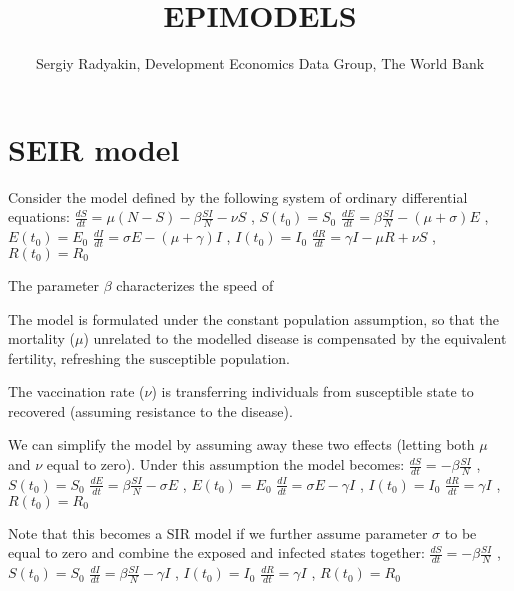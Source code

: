 \documentclass{article}
\title{EPIMODELS}
\author{Sergiy Radyakin, Development Economics Data Group, The World Bank}
\begin{document}
\maketitle


\section{SEIR model}

Consider the model defined by the following system of ordinary differential equations:
\vskip10pt
   $ \frac{dS}{dt}=\mu(N-S)-\beta\frac{SI}{N}-\nu S$ , $S(t_0)=S_0$
\vskip10pt
   $ \frac{dE}{dt}=\beta\frac{SI}{N}-(\mu+\sigma)E$ , $E(t_0)=E_0$
\vskip10pt
   $ \frac{dI}{dt}=\sigma E  -(\mu + \gamma)I $ , $I(t_0)=I_0$
\vskip10pt
   $ \frac{dR}{dt}= \gamma I - \mu R + \nu S $ , $R(t_0)=R_0$
\vskip10pt

The parameter $\beta$ characterizes the speed of  

The model is formulated under the constant population assumption, so that the mortality ($\mu$) unrelated to the modelled disease is compensated by the equivalent fertility, refreshing the susceptible population. \par

The vaccination rate ($\nu$) is transferring individuals from susceptible state to recovered (assuming resistance to the disease).\par

We can simplify the model by assuming away these two effects (letting both $\mu$ and $\nu$ equal to zero). Under this assumption the model becomes:
\vskip10pt
   $ \frac{dS}{dt}=-\beta\frac{SI}{N}$ , $S(t_0)=S_0$
\vskip10pt
   $ \frac{dE}{dt}=\beta\frac{SI}{N}-\sigma E$ , $E(t_0)=E_0$
\vskip10pt
   $ \frac{dI}{dt}=\sigma E  -\gamma I $ , $I(t_0)=I_0$
\vskip10pt
   $ \frac{dR}{dt}= \gamma I $ , $R(t_0)=R_0$
\vskip10pt

Note that this becomes a SIR model if we further assume parameter $\sigma$ to be equal to zero and combine the exposed and infected states together:
\vskip10pt
   $ \frac{dS}{dt}=-\beta\frac{SI}{N}$ , $S(t_0)=S_0$
\vskip10pt
   $ \frac{dI}{dt}=\beta\frac{SI}{N}  -\gamma I $ , $I(t_0)=I_0$
\vskip10pt
   $ \frac{dR}{dt}= \gamma I $ , $R(t_0)=R_0$
\vskip10pt
\end{document}
